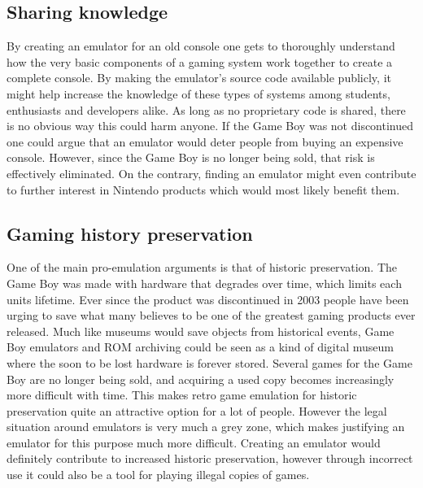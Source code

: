 \subsection{Sharing knowledge}
By creating an emulator for an old console one gets to thoroughly understand how the very basic components of a gaming system work together to create a complete console. By making the emulator's source code available publicly, it might help increase the knowledge of these types of systems among students, enthusiasts and developers alike. As long as no proprietary code is shared, there is no obvious way this could harm anyone. If the Game Boy was not discontinued one could argue that an emulator would deter people from buying an expensive console. However, since the Game Boy is no longer being sold, that risk is effectively eliminated. On the contrary, finding an emulator might even contribute to further interest in Nintendo products which would most likely benefit them.


\subsection{Gaming history preservation}
One of the main pro-emulation arguments is that of historic preservation. The Game Boy was made with hardware that degrades over time, which limits each units lifetime. Ever since the product was discontinued in 2003 \cite{gameBoyDisc} people have been urging to save what many believes to be one of the greatest gaming products ever released. Much like museums would save objects from historical events, Game Boy emulators and ROM archiving could be seen as a kind of digital museum where the soon to be lost hardware is forever stored. Several games for the Game Boy are no longer being sold, and acquiring a used copy becomes increasingly more difficult with time. This makes retro game emulation for historic preservation quite an attractive option for a lot of people. However the legal situation around emulators is very much a grey zone, which makes justifying an emulator for this purpose much more difficult. Creating an emulator would definitely contribute to increased historic preservation, however through incorrect use it could also be a tool for playing illegal copies of games.

